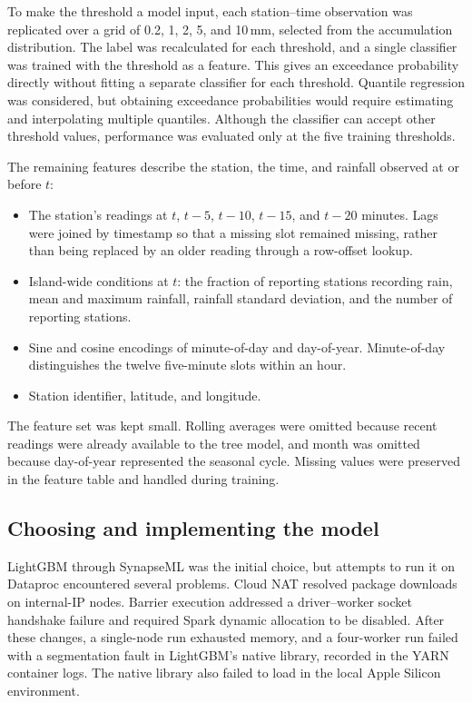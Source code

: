 \documentclass[11pt]{article}
\begin{document}
To make the threshold a model input, each station--time observation was replicated over a grid of 0.2, 1, 2, 5, and 10\,mm, selected from the accumulation distribution. The label was recalculated for each threshold, and a single classifier was trained with the threshold as a feature. This gives an exceedance probability directly without fitting a separate classifier for each threshold. Quantile regression was considered, but obtaining exceedance probabilities would require estimating and interpolating multiple quantiles. Although the classifier can accept other threshold values, performance was evaluated only at the five training thresholds.

\newpage
The remaining features describe the station, the time, and rainfall observed at or before $t$:

\begin{itemize}
  \item The station's readings at $t$, $t-5$, $t-10$, $t-15$, and $t-20$ minutes. Lags were joined by timestamp so that a missing slot remained missing, rather than being replaced by an older reading through a row-offset lookup.
  \item Island-wide conditions at $t$: the fraction of reporting stations recording rain, mean and maximum rainfall, rainfall standard deviation, and the number of reporting stations.
  \item Sine and cosine encodings of minute-of-day and day-of-year. Minute-of-day distinguishes the twelve five-minute slots within an hour.
  \item Station identifier, latitude, and longitude.
\end{itemize}

The feature set was kept small. Rolling averages were omitted because recent readings were already available to the tree model, and month was omitted because day-of-year represented the seasonal cycle. Missing values were preserved in the feature table and handled during training.

\subsection{Choosing and implementing the model}

LightGBM through SynapseML was the initial choice, but attempts to run it on Dataproc encountered several problems. Cloud NAT resolved package downloads on internal-IP nodes. Barrier execution addressed a driver--worker socket handshake failure and required Spark dynamic allocation to be disabled. After these changes, a single-node run exhausted memory, and a four-worker run failed with a segmentation fault in LightGBM's native library, recorded in the YARN container logs. The native library also failed to load in the local Apple Silicon environment.
\end{document}
